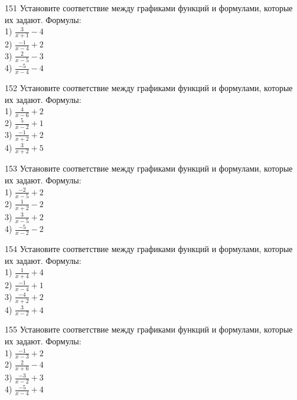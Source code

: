 \documentclass[4apaper]{article}
\begin{document}
\begin{taskBN}{151}
Установите соответствие между графиками функций и формулами, которые их задают. Формулы: \\1) $\frac{3}{x+1}-4$\\2) $\frac{-1}{x-4}+2$\\3) $\frac{2}{x-5}-3$\\4) $\frac{-5}{x-4}-4$
\end{taskBN}

\begin{taskBN}{152}
Установите соответствие между графиками функций и формулами, которые их задают. Формулы: \\1) $\frac{4}{x-6}+2$\\2) $\frac{5}{x-2}+1$\\3) $\frac{-1}{x+2}+2$\\4) $\frac{3}{x+2}+5$
\end{taskBN}

\begin{taskBN}{153}
Установите соответствие между графиками функций и формулами, которые их задают. Формулы: \\1) $\frac{-2}{x-5}+2$\\2) $\frac{1}{x+2}-2$\\3) $\frac{3}{x-5}+2$\\4) $\frac{-5}{x-2}-2$
\end{taskBN}

\begin{taskBN}{154}
Установите соответствие между графиками функций и формулами, которые их задают. Формулы: \\1) $\frac{1}{x+4}+4$\\2) $\frac{-1}{x-4}+1$\\3) $\frac{-4}{x+2}+2$\\4) $\frac{3}{x-2}+4$
\end{taskBN}

\begin{taskBN}{155}
Установите соответствие между графиками функций и формулами, которые их задают. Формулы: \\1) $\frac{-1}{x-3}+2$\\2) $\frac{2}{x+6}-4$\\3) $\frac{-3}{x-2}+3$\\4) $\frac{-5}{x-4}+4$
\end{taskBN}
\end{document}
